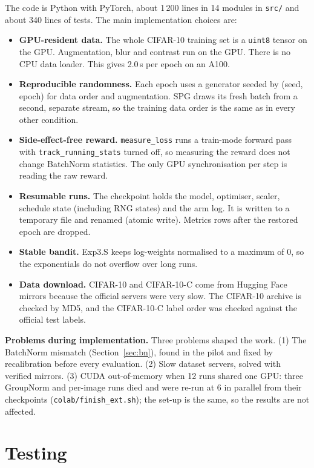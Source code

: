 \documentclass[a4paper,12pt]{report}
\begin{document}
The code is Python with PyTorch, about 1\,200 lines in 14 modules in \texttt{src/} and about 340 lines of tests. The main implementation choices are:
\begin{itemize}
\item \textbf{GPU-resident data.} The whole CIFAR-10 training set is a \texttt{uint8} tensor on the GPU. Augmentation, blur and contrast run on the GPU. There is no CPU data loader. This gives 2.0\,s per epoch on an A100.
\item \textbf{Reproducible randomness.} Each epoch uses a generator seeded by (seed, epoch) for data order and augmentation. SPG draws its fresh batch from a second, separate stream, so the training data order is the same as in every other condition.
\item \textbf{Side-effect-free reward.} \texttt{measure\_loss} runs a train-mode forward pass with \texttt{track\_running\_stats} turned off, so measuring the reward does not change BatchNorm statistics. The only GPU synchronisation per step is reading the raw reward.
\item \textbf{Resumable runs.} The checkpoint holds the model, optimiser, scaler, schedule state (including RNG states) and the arm log. It is written to a temporary file and renamed (atomic write). Metrics rows after the restored epoch are dropped.
\item \textbf{Stable bandit.} Exp3.S keeps log-weights normalised to a maximum of 0, so the exponentials do not overflow over long runs.
\item \textbf{Data download.} CIFAR-10 and CIFAR-10-C come from Hugging Face mirrors because the official servers were very slow. The CIFAR-10 archive is checked by MD5, and the CIFAR-10-C label order was checked against the official test labels.
\end{itemize}

\textbf{Problems during implementation.} Three problems shaped the work. (1) The BatchNorm mismatch (Section~\ref{sec:bn}), found in the pilot and fixed by recalibration before every evaluation. (2) Slow dataset servers, solved with verified mirrors. (3) CUDA out-of-memory when 12 runs shared one GPU: three GroupNorm and per-image runs died and were re-run at 6 in parallel from their checkpoints (\texttt{colab/finish\_ext.sh}); the set-up is the same, so the results are not affected.

\section{Testing}
\end{document}
